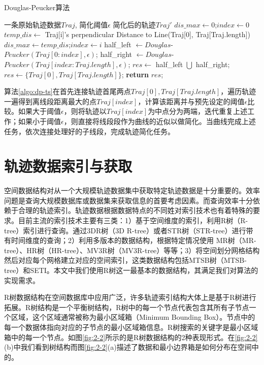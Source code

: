 \begin{algorithm}
\caption{Douglas-Peucker算法}
\label{algo:dp-ts}
\begin{algorithmic}[1] %
\Require 一条原始轨迹数据$Traj$, 简化阈值$\epsilon$ %
\Ensure 简化后的轨迹$Traj'$ %
\State $dis\_max \gets 0$;$index \gets 0$
	\State $temp\_dis \gets$ Traj[i]'s perpendicular Distance to Line(Traj[0], Traj[Traj.length])
		\State $dis\_max \gets temp\_dis$;$index \gets i$
	\EndIf
\EndFor
{}
	\State half\_left $\gets Douglas$-$Peucker(Traj[0:index],\epsilon)$;
	\State half\_right $\gets Douglas$-$Peucker(Traj[index:Traj.length],\epsilon)$;
	\State $res \gets$ half\_left $\bigcup$ half\_right;
	\Else
	\State $res \gets \{Traj[0], Traj[Traj.length]\}$;
\EndIf	
\State \textbf{return} $res$;
\end{algorithmic}
\end{algorithm}

算法\ref{algo:dp-ts}在首先连接轨迹首尾两点$Traj[0],Traj[Traj.length]$，遍历轨迹一遍得到离线段距离最大的点$Traj[index]$，计算该距离并与预先设定的阈值$\epsilon$比较。如果大于阈值$\epsilon$，则将轨迹以$Traj[index]$为中点分为两端，迭代重复上述工作；如果小于阈值$\epsilon$，则直接将线段段作为曲线的近似以做简化。当曲线完成上述任务，依次连接处理好的子线段，完成轨迹简化任务。

\section{轨迹数据索引与获取}
\label{sec:index}
空间数据结构对从一个大规模轨迹数据集中获取特定轨迹数据是十分重要的。效率问题是查询大规模数据库或数据集来获取信息的首要考虑因素。而查询效率十分依赖于合理的轨迹索引。轨迹数据根据数据特点的不同姓对索引技术也有着特殊的要求。目前主流的索引技术主要有三类：1）基于空间维度的索引，利用R树（R-tree）索引进行查询。通过3DR树（3D R-tree）或者STR树（STR-tree）进行带有时间维度的查询；2）利用多版本的数据结构，根据特定情况使用 MR树（MR-tree）、HR树（HR-tree）、MV3R树（MV3R-tree）等等；3）将空间划分网格结构然后对应每个网格建立对应的空间索引，这类数据结构包括MTSB树（MTSB-tree）和SETI。本文中我们使用R树这一最基本的数据结构，其满足我们对算法的实现需求。

R树数据结构在空间数据库中应用广泛，许多轨迹索引结构大体上是基于R树进行拓展。R树结构是一个平衡树结构，R树中的每一个节点代表包含其所有子节点一个区域，这个区域通常被称为最小区域箱（Minimum Bounding Box）。节点中的每一个数据体指向对应的子节点的最小区域箱信息。R树搜索的关键字是最小区域箱中的每一个节点。如图\ref{fig:2-2}所示的是R树数据结构的2种表现形式。在\ref{fig:2-2}(b)中我们看到树结构而图\ref{fig:2-2}(a)描述了数据和最小边界箱是如何分布在空间中的。
\\

